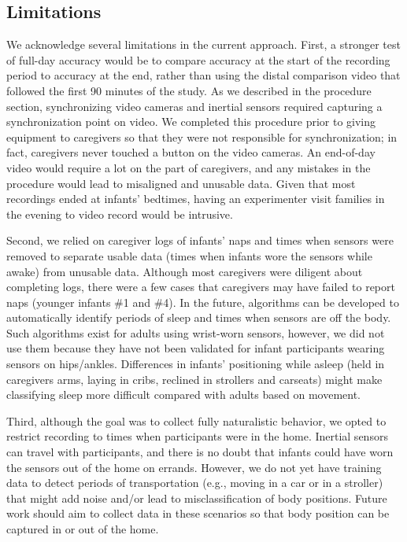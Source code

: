 \documentclass[
  man]{apa6}
\begin{document}
\hypertarget{limitations}{%
\subsection{Limitations}\label{limitations}}

We acknowledge several limitations in the current approach. First, a stronger test of full-day accuracy would be to compare accuracy at the start of the recording period to accuracy at the end, rather than using the distal comparison video that followed the first 90 minutes of the study. As we described in the procedure section, synchronizing video cameras and inertial sensors required capturing a synchronization point on video. We completed this procedure prior to giving equipment to caregivers so that they were not responsible for synchronization; in fact, caregivers never touched a button on the video cameras. An end-of-day video would require a lot on the part of caregivers, and any mistakes in the procedure would lead to misaligned and unusable data. Given that most recordings ended at infants' bedtimes, having an experimenter visit families in the evening to video record would be intrusive.

Second, we relied on caregiver logs of infants' naps and times when sensors were removed to separate usable data (times when infants wore the sensors while awake) from unusable data. Although most caregivers were diligent about completing logs, there were a few cases that caregivers may have failed to report naps (younger infants \#1 and \#4). In the future, algorithms can be developed to automatically identify periods of sleep and times when sensors are off the body. Such algorithms exist for adults using wrist-worn sensors, however, we did not use them because they have not been validated for infant participants wearing sensors on hips/ankles. Differences in infants' positioning while asleep (held in caregivers arms, laying in cribs, reclined in strollers and carseats) might make classifying sleep more difficult compared with adults based on movement.

Third, although the goal was to collect fully naturalistic behavior, we opted to restrict recording to times when participants were in the home. Inertial sensors can travel with participants, and there is no doubt that infants could have worn the sensors out of the home on errands. However, we do not yet have training data to detect periods of transportation (e.g., moving in a car or in a stroller) that might add noise and/or lead to misclassification of body positions. Future work should aim to collect data in these scenarios so that body position can be captured in or out of the home.
\end{document}
